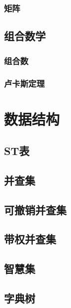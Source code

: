 \subsubsection{矩阵}

\subsection{组合数学}
\subsubsection{组合数}

\subsubsection{卢卡斯定理}


\section{数据结构}
\subsection{ST表}


\subsection{并查集}


\subsection{可撤销并查集}

\subsection{带权并查集}


\subsection{智慧集}


\subsection{字典树}

